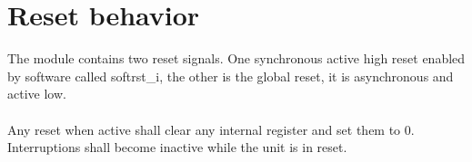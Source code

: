 \section{Reset behavior}

The module contains two reset signals. One synchronous active high reset enabled by software called softrst\_i, the other is the global reset, it is asynchronous and active low.\\
\\
Any reset when active shall clear any internal register and set them to 0. Interruptions shall become inactive while the unit is in reset.




